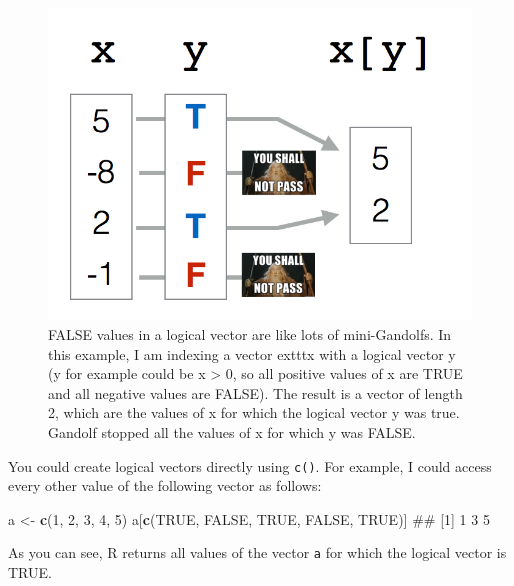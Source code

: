 \documentclass[]{book}
\newenvironment{Shaded}{\begin{snugshade}}{\end{snugshade}}
\newcommand{\KeywordTok}[1]{\textcolor[rgb]{0.13,0.29,0.53}{\textbf{{#1}}}}
\newcommand{\DecValTok}[1]{\textcolor[rgb]{0.00,0.00,0.81}{{#1}}}
\newcommand{\StringTok}[1]{\textcolor[rgb]{0.31,0.60,0.02}{{#1}}}
\newcommand{\OtherTok}[1]{\textcolor[rgb]{0.56,0.35,0.01}{{#1}}}
\newcommand{\NormalTok}[1]{{#1}}
\theoremstyle{definition}
\theoremstyle{definition}
\theoremstyle{remark}
\begin{document}
\begin{figure}

{\centering \includegraphics[width=500px]{images/indexgandolf} 

}

\caption{FALSE values in a logical vector are like lots of mini-Gandolfs. In this example, I am indexing a vector   exttt{x} with a logical vector y (y for example could be x > 0, so all positive values of x are TRUE and all negative values are FALSE). The result is a vector of length 2, which are the values of x for which the logical vector y was true. Gandolf stopped all the values of x for which y was FALSE.}\label{fig:unnamed-chunk-136}
\end{figure}

You could create logical vectors directly using \texttt{c()}. For
example, I could access every other value of the following vector as
follows:

\begin{Shaded}
\begin{Highlighting}[]
\NormalTok{a <-}\StringTok{ }\KeywordTok{c}\NormalTok{(}\DecValTok{1}\NormalTok{, }\DecValTok{2}\NormalTok{, }\DecValTok{3}\NormalTok{, }\DecValTok{4}\NormalTok{, }\DecValTok{5}\NormalTok{)}
\NormalTok{a[}\KeywordTok{c}\NormalTok{(}\OtherTok{TRUE}\NormalTok{, }\OtherTok{FALSE}\NormalTok{, }\OtherTok{TRUE}\NormalTok{, }\OtherTok{FALSE}\NormalTok{, }\OtherTok{TRUE}\NormalTok{)]}
\NormalTok{## [1] 1 3 5}
\end{Highlighting}
\end{Shaded}

As you can see, R returns all values of the vector \texttt{a} for which
the logical vector is TRUE.
\end{document}
